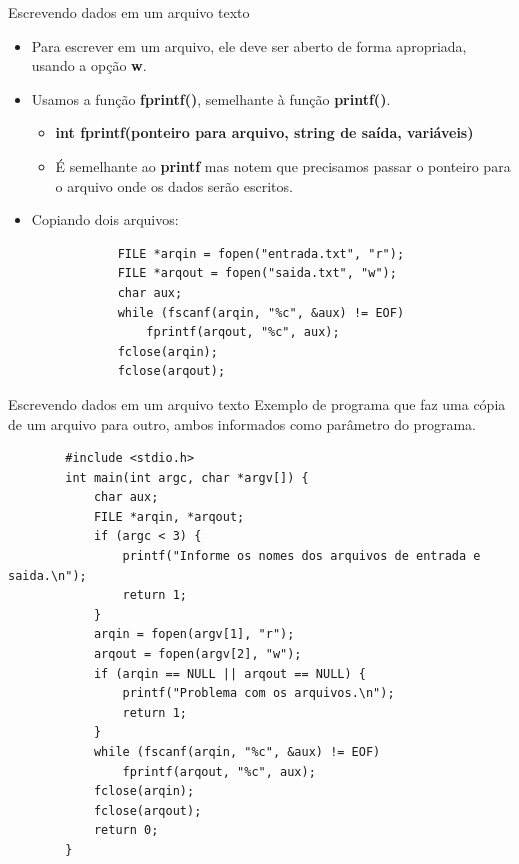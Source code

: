 \documentclass[handout]{beamer}
\begin{document}
\begin{frame}[fragile]{Escrevendo dados em um arquivo texto}

    \begin{itemize}
        \item Para escrever em um arquivo, ele deve ser aberto de forma
        apropriada, usando a opção \textbf{w}.
        \item Usamos a função \textbf{fprintf()}, semelhante à função
        \textbf{printf()}.
        \begin{itemize}
            \item \textbf{int fprintf(ponteiro para arquivo, string de saída, variáveis)}
            \item É semelhante ao \textbf{printf} mas notem que precisamos passar
            o ponteiro para o arquivo onde os dados serão escritos.
        \end{itemize}

        \item Copiando dois arquivos:
         \begin{verbatim}
            FILE *arqin = fopen("entrada.txt", "r");
            FILE *arqout = fopen("saida.txt", "w");
            char aux;
            while (fscanf(arqin, "%c", &aux) != EOF)
                fprintf(arqout, "%c", aux);
            fclose(arqin);
            fclose(arqout);
         \end{verbatim}
  \end{itemize}

\end{frame}

\begin{frame}[fragile]{Escrevendo dados em um arquivo texto}
    \vspace{-0.9em}
    Exemplo de programa que faz uma cópia de um arquivo para outro, ambos informados como
    parâmetro do programa.
    \vspace{-1em}
    \begin{verbatim}
        #include <stdio.h>
        int main(int argc, char *argv[]) {
            char aux;
            FILE *arqin, *arqout;
            if (argc < 3) {
                printf("Informe os nomes dos arquivos de entrada e saida.\n");
                return 1;
            }
            arqin = fopen(argv[1], "r");
            arqout = fopen(argv[2], "w");
            if (arqin == NULL || arqout == NULL) {
                printf("Problema com os arquivos.\n");
                return 1;
            }
            while (fscanf(arqin, "%c", &aux) != EOF)
                fprintf(arqout, "%c", aux);
            fclose(arqin);
            fclose(arqout);
            return 0;
        }
  \end{verbatim}

\end{frame}
\end{document}
